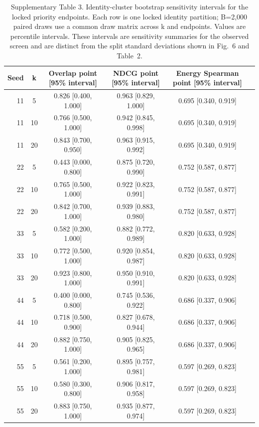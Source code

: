 \begin{table}[ht]\centering\scriptsize\caption{Supplementary Table 3. Identity-cluster bootstrap sensitivity intervals for the locked priority endpoints. Each row is one locked identity partition; B=2,000 paired draws use a common draw matrix across k and endpoints. Values are percentile intervals. These intervals are sensitivity summaries for the observed screen and are distinct from the split standard deviations shown in Fig.~6 and Table~2.}\label{tab:priority_bootstrap}\begin{tabular}{rccccl}\toprule Seed & k & Overlap point [95\% interval] & NDCG point [95\% interval] & Energy Spearman point [95\% interval] \\ \midrule
11 & 5 & 0.826 [0.400, 1.000] & 0.963 [0.829, 1.000] & 0.695 [0.340, 0.919] \\
11 & 10 & 0.766 [0.500, 1.000] & 0.942 [0.845, 0.998] & 0.695 [0.340, 0.919] \\
11 & 20 & 0.843 [0.700, 0.950] & 0.963 [0.915, 0.992] & 0.695 [0.340, 0.919] \\
22 & 5 & 0.443 [0.000, 0.800] & 0.875 [0.720, 0.990] & 0.752 [0.587, 0.877] \\
22 & 10 & 0.765 [0.500, 1.000] & 0.922 [0.823, 0.991] & 0.752 [0.587, 0.877] \\
22 & 20 & 0.842 [0.700, 1.000] & 0.939 [0.883, 0.980] & 0.752 [0.587, 0.877] \\
33 & 5 & 0.582 [0.200, 1.000] & 0.882 [0.772, 0.989] & 0.820 [0.633, 0.928] \\
33 & 10 & 0.772 [0.500, 1.000] & 0.920 [0.854, 0.987] & 0.820 [0.633, 0.928] \\
33 & 20 & 0.923 [0.800, 1.000] & 0.950 [0.910, 0.991] & 0.820 [0.633, 0.928] \\
44 & 5 & 0.400 [0.000, 0.800] & 0.745 [0.536, 0.922] & 0.686 [0.337, 0.906] \\
44 & 10 & 0.718 [0.500, 0.900] & 0.827 [0.678, 0.944] & 0.686 [0.337, 0.906] \\
44 & 20 & 0.882 [0.750, 1.000] & 0.905 [0.825, 0.965] & 0.686 [0.337, 0.906] \\
55 & 5 & 0.561 [0.200, 1.000] & 0.895 [0.757, 0.981] & 0.597 [0.269, 0.823] \\
55 & 10 & 0.580 [0.300, 0.800] & 0.906 [0.817, 0.958] & 0.597 [0.269, 0.823] \\
55 & 20 & 0.883 [0.750, 1.000] & 0.935 [0.877, 0.974] & 0.597 [0.269, 0.823] \\
\bottomrule\end{tabular}\end{table}
